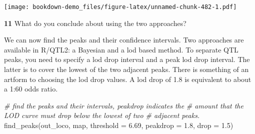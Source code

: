 \documentclass[
]{book}
\makeatletter
\newenvironment{Shaded}{\begin{snugshade}}{\end{snugshade}}
\newcommand{\AttributeTok}[1]{\textcolor[rgb]{0.77,0.63,0.00}{#1}}
\newcommand{\CommentTok}[1]{\textcolor[rgb]{0.56,0.35,0.01}{\textit{#1}}}
\newcommand{\DecValTok}[1]{\textcolor[rgb]{0.00,0.00,0.81}{#1}}
\newcommand{\FloatTok}[1]{\textcolor[rgb]{0.00,0.00,0.81}{#1}}
\newcommand{\FunctionTok}[1]{\textcolor[rgb]{0.00,0.00,0.00}{#1}}
\newcommand{\NormalTok}[1]{#1}
\newcommand{\SpecialCharTok}[1]{\textcolor[rgb]{0.00,0.00,0.00}{#1}}
\newcommand{\StringTok}[1]{\textcolor[rgb]{0.31,0.60,0.02}{#1}}
\newenvironment{kframe}{%
\medskip{}
\setlength{\fboxsep}{.8em}
 \def\at@end@of@kframe{}%
 \ifinner\ifhmode%
  \def\at@end@of@kframe{\end{minipage}}%
  \begin{minipage}{\columnwidth}%
 \fi\fi%
 \def\FrameCommand##1{\hskip\@totalleftmargin \hskip-\fboxsep
 \colorbox{shadecolor}{##1}\hskip-\fboxsep
     \hskip-\linewidth \hskip-\@totalleftmargin \hskip\columnwidth}%
 \MakeFramed {\advance\hsize-\width
   \@totalleftmargin\z@ \linewidth\hsize
   \@setminipage}}%
 {\par\unskip\endMakeFramed%
 \at@end@of@kframe}
\newenvironment{rmdblock}[1]
  {
  \begin{itemize}
  \renewcommand{\labelitemi}{
    \raisebox{-.7\height}[0pt][0pt]{
      {\setkeys{Gin}{width=3em,keepaspectratio}\texttt{[image: images/\#1]}}
    }
  }
  \setlength{\fboxsep}{1em}
  \begin{kframe}
  \item
  }
  {
  \end{kframe}
  \end{itemize}
  }
\newenvironment{rmdquiz}
  {\begin{rmdblock}{quiz}}
  {\end{rmdblock}}
\makeatother
\begin{document}
\begin{Shaded}
\end{Shaded}

\texttt{[image: bookdown-demo\_files/figure-latex/unnamed-chunk-482-1.pdf]}

\begin{rmdquiz}
\textbf{11}
What do you conclude about using the two approaches?
\end{rmdquiz}

We can now find the peaks and their confidence intervals. Two approaches are available in R/QTL2: a Bayesian and a lod based method. To separate QTL peaks, you need to specify a lod drop interval and a peak lod drop interval. The latter is to cover the lowest of the two adjacent peaks. There is something of an artform to choosing the lod drop values. A lod drop of 1.8 is equivalent to about a 1:60 odds ratio.

\begin{Shaded}
\begin{Highlighting}[]
\CommentTok{\# find the peaks and their intervals, peakdrop indicates the}
\CommentTok{\# amount that the LOD curve must drop below the lowest of two}
\CommentTok{\# adjacent peaks.}
\FunctionTok{find\_peaks}\NormalTok{(out\_loco, map, }\AttributeTok{threshold =} \FloatTok{6.69}\NormalTok{, }\AttributeTok{peakdrop =} \FloatTok{1.8}\NormalTok{, }\AttributeTok{drop =} \FloatTok{1.5}\NormalTok{)}
\end{Highlighting}
\end{Shaded}
\end{document}
